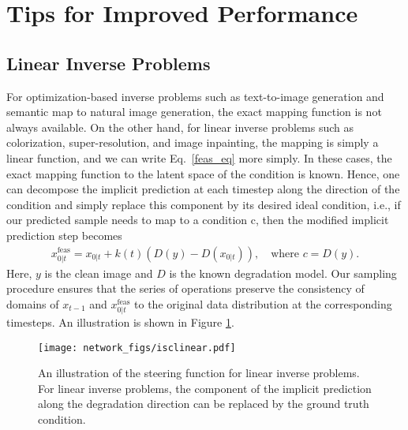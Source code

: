 \documentclass[10pt,twocolumn,letterpaper]{article}
\begin{document}
\section{Tips for Improved Performance}
\subsection{Linear Inverse Problems}

For optimization-based inverse problems such as text-to-image generation and semantic map to natural image generation, the exact mapping function is not always available. On the other hand, for linear inverse problems such as colorization, super-resolution, and image inpainting, the mapping is simply a linear function, and we can write Eq.~\eqref{feas_eq} more simply.  In these cases, the exact mapping function to the latent space of the condition is known. Hence, one can decompose the implicit prediction at each timestep along the direction of the condition and simply replace this component by its desired ideal condition, i.e., if our predicted sample needs to map to a condition c, then the modified implicit prediction step becomes 
\begin{align}
  x^\mathrm{feas}_{0|t} = x_{0|t} +k(t)(D(y)-D(x_{0|t} )), \quad
   \text{where } c=D(y).
\end{align}
Here, $y$ is the clean image and $D$ is the known degradation model. Our sampling procedure ensures that the series of operations preserve the consistency of domains of $x_{t-1}$ and $x_{0|t}^\mathrm{feas}$ to the original data distribution at the corresponding timesteps. An illustration is shown in Figure \ref{fig:isclinear}.


\begin{figure}[!tb]
    \centering
    \texttt{[image: network\_figs/isclinear.pdf]}
    \vspace{-3mm}
  \caption{{An illustration of the steering function for linear inverse problems. For linear inverse problems, the component of the implicit prediction along the degradation direction can be replaced by the ground truth condition.  }}
    \label{fig:isclinear}
    \vspace{-5mm}
\end{figure}
\end{document}
